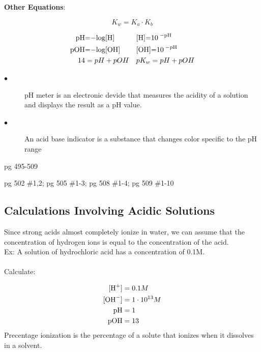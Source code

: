 \documentclass{article}
\begin{document}
\begin{paragraph}
\textbf{Other Equations}:

\begin{center}
  \begin{equation*}
   K_w=K_a\cdot{K_b}
    \end{equation*}
\end{center} 
\begin{center}
\begin{align*}
\ce{pH&=-log[H]}&&
\ce{[H]=10^{-pH}}\\
\ce{pOH&=-log[OH]}&&
\ce{[OH]=10^{-pH}}\\
 \vspace{4mm}
 14&=pH+pOH &&
 pK_w = pH + pOH 
\end{align*}
\end{center}

\begin{description}
  \item[$\bullet$]pH meter is an electronic devide that measures the acidity of a solution and displays the result as a pH value.\\

  \item[$\bullet$]An acid base indicator is a substance that changes color specific to the pH range\\
\end{description}
    
pg 495-509

pg 502 \#1,2;
pg 505 \#1-3;
pg 508 \#1-4;
pg 509 \#1-10

\subsection{Calculations Involving Acidic Solutions}

Since strong acids almost completely ionize in water, we can assume that the concentration of hydrogen ions is equal to the concentration of the acid.\\

\noindent
Ex: A solution of hydrochloric acid has a concentration of 0.1M.
\\
\\Calculate:
\begin{center}
\end{center}
\begin{align*}
\ce{[H+]} &= 0.1M \\
\ce{[OH^-]} &= 1\cdot10^{13}M\\
\ce{pH} &= 1\\
\ce{pOH} &= 13\\
\end{align*}
\noindent
Precentage ionization is the percentage of a solute that ionizes when it dissolves in a solvent.\\


\end{paragraph}
\end{document}
